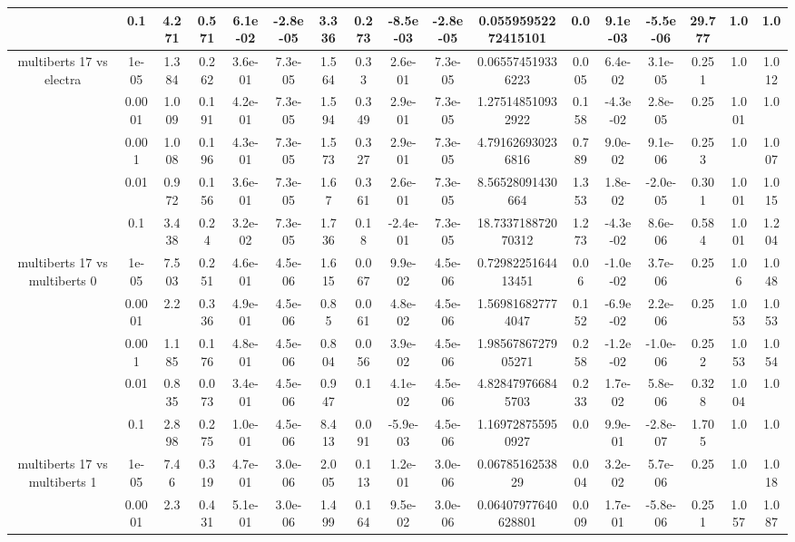 \begin{tabular}{|c|c|c|c|c|c|c|c|c|c|c|c|c|c|c|c|c|}
 & 0.1 & 4.271 & 0.571 & 6.1e-02 & -2.8e-05 & 3.336 & 0.273 & -8.5e-03 & -2.8e-05 & 0.05595952272415101 & 0.0 & 9.1e-03 & -5.5e-06 & 29.777 & 1.0 & 1.0 \\
\hline
\multirow{5}{*}{multiberts 17 vs electra } & 1e-05 & 1.384 & 0.262 & 3.6e-01 & 7.3e-05 & 1.564 & 0.33 & 2.6e-01 & 7.3e-05 & 0.065574519336223 & 0.005 & 6.4e-02 & 3.1e-05 & 0.251 & 1.0 & 1.012 \\
 & 0.0001 & 1.009 & 0.191 & 4.2e-01 & 7.3e-05 & 1.594 & 0.349 & 2.9e-01 & 7.3e-05 & 1.275148510932922 & 0.158 & -4.3e-02 & 2.8e-05 & 0.25 & 1.001 & 1.0 \\
 & 0.001 & 1.008 & 0.196 & 4.3e-01 & 7.3e-05 & 1.573 & 0.327 & 2.9e-01 & 7.3e-05 & 4.791626930236816 & 0.789 & 9.0e-02 & 9.1e-06 & 0.253 & 1.0 & 1.007 \\
 & 0.01 & 0.972 & 0.156 & 3.6e-01 & 7.3e-05 & 1.67 & 0.361 & 2.6e-01 & 7.3e-05 & 8.56528091430664 & 1.353 & 1.8e-02 & -2.0e-05 & 0.301 & 1.001 & 1.015 \\
 & 0.1 & 3.438 & 0.24 & 3.2e-02 & 7.3e-05 & 1.736 & 0.18 & -2.4e-01 & 7.3e-05 & 18.733718872070312 & 1.273 & -4.3e-02 & 8.6e-06 & 0.584 & 1.001 & 1.204 \\
\hline
\multirow{5}{*}{multiberts 17 vs multiberts 0} & 1e-05 & 7.503 & 0.251 & 4.6e-01 & 4.5e-06 & 1.615 & 0.067 & 9.9e-02 & 4.5e-06 & 0.7298225164413451 & 0.06 & -1.0e-02 & 3.7e-06 & 0.25 & 1.06 & 1.048 \\
 & 0.0001 & 2.2 & 0.336 & 4.9e-01 & 4.5e-06 & 0.85 & 0.061 & 4.8e-02 & 4.5e-06 & 1.569816827774047 & 0.152 & -6.9e-02 & 2.2e-06 & 0.25 & 1.053 & 1.053 \\
 & 0.001 & 1.185 & 0.176 & 4.8e-01 & 4.5e-06 & 0.804 & 0.056 & 3.9e-02 & 4.5e-06 & 1.9856786727905271 & 0.258 & -1.2e-02 & -1.0e-06 & 0.252 & 1.053 & 1.054 \\
 & 0.01 & 0.835 & 0.073 & 3.4e-01 & 4.5e-06 & 0.947 & 0.1 & 4.1e-02 & 4.5e-06 & 4.828479766845703 & 0.233 & 1.7e-02 & 5.8e-06 & 0.328 & 1.004 & 1.0 \\
 & 0.1 & 2.898 & 0.275 & 1.0e-01 & 4.5e-06 & 8.413 & 0.091 & -5.9e-03 & 4.5e-06 & 1.169728755950927 & 0.0 & 9.9e-01 & -2.8e-07 & 1.705 & 1.0 & 1.0 \\
\hline
\multirow{5}{*}{multiberts 17 vs multiberts 1} & 1e-05 & 7.46 & 0.319 & 4.7e-01 & 3.0e-06 & 2.005 & 0.113 & 1.2e-01 & 3.0e-06 & 0.0678516253829 & 0.004 & 3.2e-02 & 5.7e-06 & 0.25 & 1.0 & 1.018 \\
 & 0.0001 & 2.3 & 0.431 & 5.1e-01 & 3.0e-06 & 1.499 & 0.164 & 9.5e-02 & 3.0e-06 & 0.06407977640628801 & 0.009 & 1.7e-01 & -5.8e-06 & 0.251 & 1.057 & 1.087 \\

\end{tabular}
